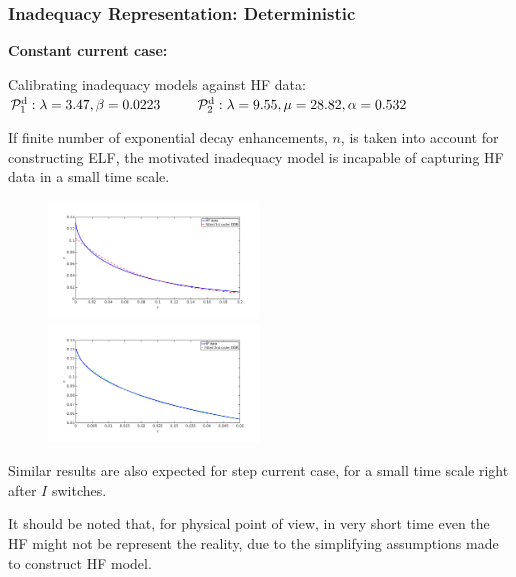 \documentclass[10pt,xcolor=dvipsnames,compress]{beamer}
\begin{document}
\begin{frame}
\frametitle{Inadequacy Representation: Deterministic}
\vfill


\textbf{Constant current case:}


Calibrating inadequacy models against HF data: \\
$\mathcal{P}_1^{\rm d}:   \lambda = 3.47, \beta = 0.0223 \qquad$
$\mathcal{P}_2^{\rm d}:   \lambda = 9.55, \mu = 28.82, \alpha = 0.532$


If finite number of exponential decay enhancements, $n$, is taken into account for constructing ELF, the motivated inadequacy model is incapable of capturing HF data in a small time scale.
\vspace{-0.2in}
\begin{figure}
\includegraphics[trim = 1.in 1.in 1.in 1.3in, clip, width=0.5\textwidth]{figs/Iconst_eps_modelfit_1st_zoom.png}
~
\includegraphics[trim = 1.in 1.in 1.in 1.3in, clip, width=0.5\textwidth]{figs/Iconst_eps_modelfit_2nd_zoom.png}
\end{figure}
\vspace{-0.1in}
Similar results are also expected for step current case, for a small time scale right after $I$ switches.

It should be noted that, for physical point of view, in very short time even the HF might not be represent the reality, due to the simplifying assumptions made to construct HF model.


\vfill
\end{frame}
\end{document}
